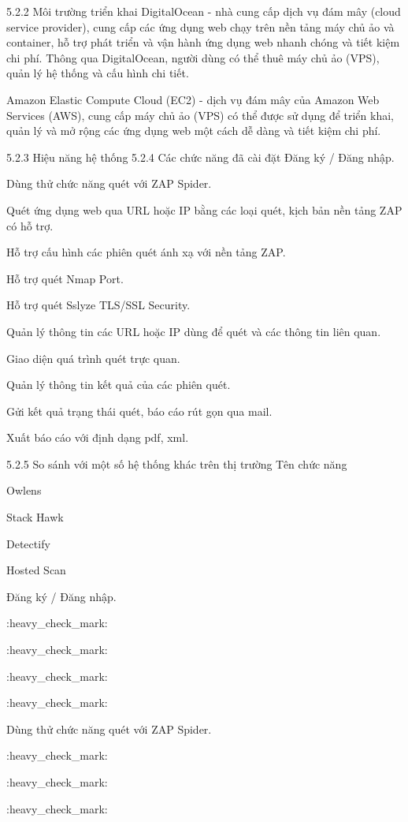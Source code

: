5.2.2 Môi trường triển khai
 DigitalOcean - nhà cung cấp dịch vụ đám mây (cloud service provider), cung cấp các ứng dụng web chạy trên nền tảng máy chủ ảo và container, hỗ trợ phát triển và vận hành ứng dụng web nhanh chóng và tiết kiệm chi phí. Thông qua DigitalOcean, người dùng có thể thuê máy chủ ảo (VPS), quản lý hệ thống và cấu hình chi tiết.

Amazon Elastic Compute Cloud (EC2) - dịch vụ đám mây của Amazon Web Services (AWS), cung cấp máy chủ ảo (VPS) có thể được sử dụng để triển khai, quản lý và mở rộng các ứng dụng web một cách dễ dàng và tiết kiệm chi phí.

5.2.3 Hiệu năng hệ thống
5.2.4 Các chức năng đã cài đặt
Đăng ký / Đăng nhập.

Dùng thử chức năng quét với ZAP Spider.

Quét ứng dụng web qua URL hoặc IP bằng các loại quét, kịch bản nền tảng ZAP có hỗ trợ.

Hỗ trợ cấu hình các phiên quét ánh xạ với nền tảng ZAP.

Hỗ trợ quét Nmap Port.

Hỗ trợ quét Sslyze TLS/SSL Security.

Quản lý thông tin các URL hoặc IP dùng để quét và các thông tin liên quan.

Giao diện quá trình quét trực quan.

Quản lý thông tin kết quả của các phiên quét.

Gửi kết quả trạng thái quét, báo cáo rút gọn qua mail.

Xuất báo cáo với định dạng pdf, xml.

5.2.5 So sánh với một số hệ thống khác trên thị trường
Tên chức năng

Owlens

Stack Hawk

Detectify

Hosted Scan

Đăng ký / Đăng nhập.

:heavy_check_mark: 

:heavy_check_mark:  

:heavy_check_mark:  

:heavy_check_mark:  

Dùng thử chức năng quét với ZAP Spider.

:heavy_check_mark:  

:heavy_check_mark:  

 

:heavy_check_mark:  

